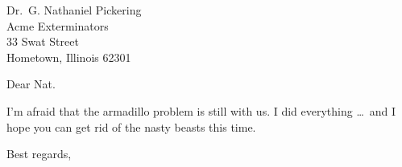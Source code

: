   \address{1234 Ave.\ of the Armadillos \\
           Gnu York, G.Y. 56789}
  \signature{R. (Ma) Dillo \\ Director of Cuisine}

  \begin{letter}{Dr.\ G. Nathaniel Pickering\\
                 Acme Exterminators\\
                 33 Swat Street \\
                 Hometown, Illinois 62301
                }
    \opening{Dear Nat.}
    
    I'm afraid that the armadillo problem is still with us. I did everything
    \dots\ and I hope you can get rid of the nasty beasts this time.
    
    \closing{Best regards,}
  \end{letter}



